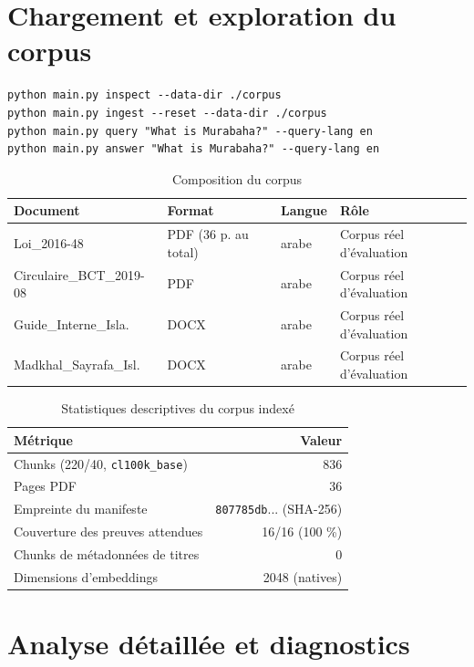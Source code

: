\documentclass[a4paper,12pt]{report}
\begin{document}
\section{Chargement et exploration du corpus}
\begin{verbatim}
python main.py inspect --data-dir ./corpus
python main.py ingest --reset --data-dir ./corpus
python main.py query "What is Murabaha?" --query-lang en
python main.py answer "What is Murabaha?" --query-lang en
\end{verbatim}

\begin{table}[H]
\centering
\begin{tabular}{|l|l|l|l|}
\hline
Document & Format & Langue & R\^ole \\
\hline
Loi\_2016-48 & PDF (36 p. au total) & arabe & Corpus r\'eel d'\'evaluation \\
\hline
Circulaire\_BCT\_2019-08 & PDF & arabe & Corpus r\'eel d'\'evaluation \\
\hline
Guide\_Interne\_Isla. & DOCX & arabe & Corpus r\'eel d'\'evaluation \\
\hline
Madkhal\_Sayrafa\_Isl. & DOCX & arabe & Corpus r\'eel d'\'evaluation \\
\hline
\end{tabular}
\caption{Composition du corpus}
\end{table}

\begin{table}[H]
\centering
\begin{tabular}{|l|r|}
\hline
M\'etrique & Valeur \\
\hline
Chunks (220/40, \texttt{cl100k\_base}) & 836 \\
\hline
Pages PDF & 36 \\
\hline
Empreinte du manifeste & \texttt{807785db}... (SHA-256) \\
\hline
Couverture des preuves attendues & 16/16 (100 \%) \\
\hline
Chunks de m\'etadonn\'ees de titres & 0 \\
\hline
Dimensions d'embeddings & 2048 (natives) \\
\hline
\end{tabular}
\caption{Statistiques descriptives du corpus index\'e}
\end{table}

\section{Analyse d\'etaill\'ee et diagnostics}
\end{document}
